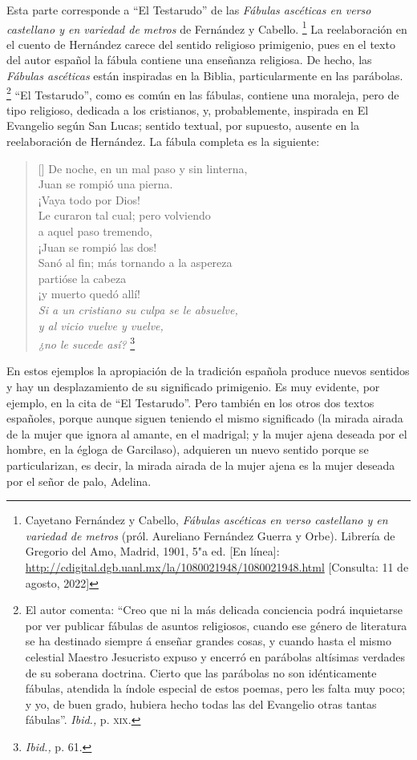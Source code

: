 \documentclass[14pt,twoside,final]{extbook} %
\let\oldfootnote\footnote
\renewcommand\footnote[1]{%
\oldfootnote{\hspace{1mm}#1}}
\begin{document}
Esta parte corresponde a ``El Testarudo'' de las \emph{Fábulas ascéticas en verso castellano y en variedad de metros} de Fernández y Cabello.\footnote{Cayetano Fernández y Cabello, \emph{Fábulas ascéticas en verso castellano y en variedad de metros} (pról. Aureliano Fernández Guerra y Orbe). Librería de Gregorio del Amo, Madrid, 1901, 5"a ed. [En línea]: \url{http://cdigital.dgb.uanl.mx/la/1080021948/1080021948.html} [Consulta: 11 de agosto, 2022]} La reelaboración en el cuento de Hernández carece del sentido religioso primigenio, pues en el texto del autor español la fábula contiene una enseñanza religiosa. De hecho, las \emph{Fábulas ascéticas} están inspiradas en la Biblia, particularmente en las parábolas.\footnote{El autor comenta: ``Creo que ni la más delicada conciencia podrá inquietarse por ver publicar fábulas de asuntos religiosos, cuando ese género de literatura se ha destinado siempre á enseñar grandes cosas, y cuando hasta el mismo celestial Maestro Jesucristo expuso y encerró en parábolas altísimas verdades de su soberana doctrina. Cierto que las parábolas no son idénticamente fábulas, atendida la índole especial de estos poemas, pero les falta muy poco; y yo, de buen grado, hubiera hecho todas las del Evangelio otras tantas fábulas''. \emph{Ibid.,} p. \textsc{xix}.} ``El Testarudo'', como es común en las fábulas, contiene una moraleja, pero de tipo religioso, dedicada a los cristianos, y, probablemente, inspirada en El Evangelio según San Lucas; sentido textual, por supuesto, ausente en la reelaboración de Hernández. La fábula completa es la siguiente:
\settowidth{\versewidth}{Si a un cristiano su culpa se le absuelve,}
\begin{verse}[\versewidth]
De noche, en un mal paso y sin linterna, \\
Juan se rompió una pierna. \\
¡Vaya todo por Dios! \\
Le curaron tal cual; pero volviendo \\
a aquel paso tremendo, \\
¡Juan se rompió las dos! \\
Sanó al fin; más tornando a la aspereza \\
partióse la cabeza \\
¡y muerto quedó allí! \\
\emph{Si a un cristiano su culpa se le absuelve, \\
y al vicio vuelve y vuelve, \\
¿no le sucede así?}\footnote{\emph{Ibid.,} p. 61.}
\end{verse}
En estos ejemplos la apropiación de la tradición española produce nuevos sentidos y hay un desplazamiento de su significado primigenio. Es muy evidente, por ejemplo, en la cita de ``El Testarudo''. Pero también en los otros dos textos españoles, porque aunque siguen teniendo el mismo significado (la mirada airada de la mujer que ignora al amante, en el madrigal; y la mujer ajena deseada por el hombre, en la égloga de Garcilaso), adquieren un nuevo sentido porque se particularizan, es decir, la mirada airada de la mujer ajena es la mujer deseada por el señor de palo, Adelina.
\end{document}
